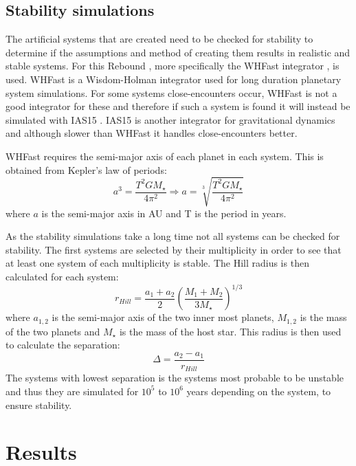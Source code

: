 \documentclass[12pt]{report}
\begin{document}
\section{Stability simulations}
	The artificial systems that are created need to be checked for stability to determine if the assumptions and method of creating them results in realistic and stable systems. For this Rebound \citep{2012A&A...537A.128R}, more specifically the WHFast integrator \citep{2015MNRAS.452..376R}, is used. WHFast is a Wisdom-Holman integrator used for long duration planetary system simulations. For some systems close-encounters occur, WHFast is not a good integrator for these and therefore if such a system is found it will instead be simulated with IAS15 \citep{2015MNRAS.446.1424R}. IAS15 is another integrator for gravitational dynamics and although slower than WHFast it handles close-encounters better.
	
	WHFast requires the semi-major axis of each planet in each system. This is obtained from Kepler's law of periods:
	\begin{equation}
		a^3 = \frac{T^2 G M_{\star}}{4\pi^2} \Rightarrow a = \sqrt[3]{\frac{T^2 G M_{\star}}{4\pi^2}}
	\end{equation}
		where $a$ is the semi-major axis in AU and T is the period in years. 
		
	As the stability simulations take a long time not all systems can be checked for stability. The first systems are selected by their multiplicity in order to see that at least one system of each multiplicity is stable. The Hill radius is then calculated for each system:
	\begin{equation}
		r_{Hill} = \frac{a_1 + a_2}{2}\left(\frac{M_1 + M_2}{3M_{\star}}\right)^{1/3}
	\end{equation}
	where $a_{1,2}$ is the semi-major axis of the two inner most planets, $M_{1,2}$ is the mass of the two planets and $M_{\star}$ is the mass of the host star. This radius is then used to calculate the separation:
	\begin{equation}
		\Delta = \frac{a_2 - a_1}{r_{Hill}}
	\end{equation}
	The systems with lowest separation is the systems most probable to be unstable \citep{1996Icar..119..261C} and thus they are simulated for $10^5$ to $10^6$ years depending on the system, to ensure stability. 
	

	

\chapter{Results}
\end{document}
